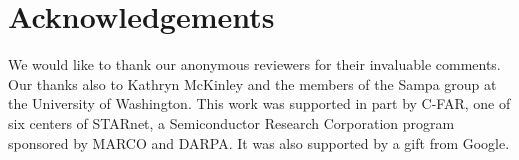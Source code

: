 \documentclass[10pt,nocopyrightspace]{sigplanconf}
\begin{document}
\section*{Acknowledgements}

We would like to thank our anonymous reviewers for their invaluable comments.
Our thanks also to Kathryn McKinley and the members of the Sampa group at the University of Washington.
This work was supported in part by C-FAR, one of six centers of STARnet, a
Semiconductor Research Corporation program sponsored by MARCO and DARPA.
It was also supported by a gift from Google.



{}

\end{document}
